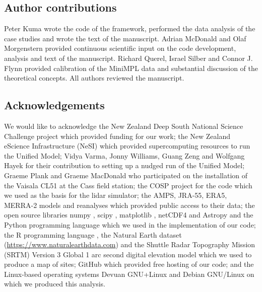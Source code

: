 \subsection*{Author contributions}

Peter Kuma wrote the code of the framework, performed the data analysis
of the case studies and wrote the text of the manuscript. Adrian McDonald and
Olaf Morgenstern provided continuous scientific input on the code development,
analysis and text of the manuscript. Richard Querel, Israel Silber and Connor
J. Flynn provided calibration of the MiniMPL data and substantial discussion
of the theoretical concepts. All authors reviewed the manuscript.

\subsection*{Acknowledgements}

We would like to acknowledge the New Zealand Deep South National Science Challenge 
project which provided funding for our work; the New Zealand eScience
Infrastructure (NeSI) which provided supercomputing resources to run the Unified
Model; Vidya Varma, Jonny Williams, Guang Zeng and Wolfgang Hayek for their
contribution to setting up a nudged run of the Unified Model;
Graeme Plank and Graeme MacDonald who participated on the installation of
the Vaisala CL51 at the Cass field station; the COSP project for the code which
we used as the basis for the lidar simulator; the AMPS, JRA-55, ERA5, MERRA-2
models and reanalyses which provided public access to their data; the open source libraries numpy \citep{derwalt2011}, scipy \citep{scipy2019}, matplotlib \citep{hunter2007}, netCDF4 \citep{rew1990} and Astropy \citep{astropy2018} and the
Python programming language \citep{rossum1995} which we used in the
implementation of our code; the R programming language \citep{r2017}, the Natural Earth
dataset (\url{https://www.naturalearthdata.com}) and the Shuttle Radar Topography Mission (SRTM) Version 3 Global 1 arc second digital elevation model \citep{werner2001,srtm}
which we used to produce a map of sites; GitHub which provided free hosting
of our code; and the Linux-based \citep{torvalds1997} operating systems
Devuan GNU+Linux and Debian GNU/Linux on which we produced this analysis.

\normalfont
\normalsize
